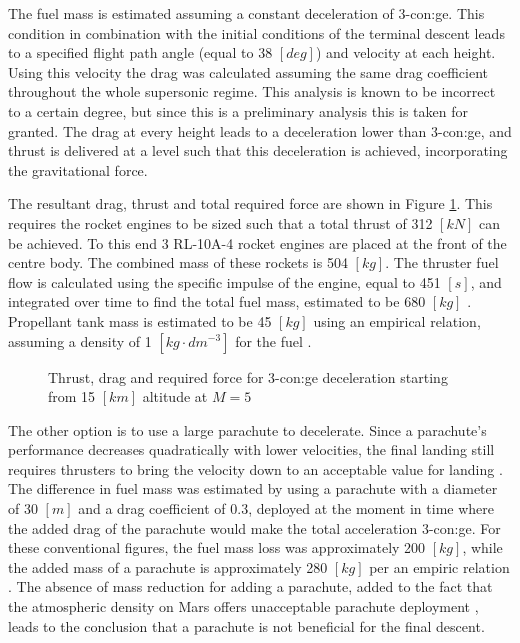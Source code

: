 The fuel mass is estimated assuming a constant deceleration of 3-\gls{con:ge}. This condition in combination with the initial conditions of the terminal descent leads to a specified flight path angle (equal to 38 $[deg]$) and velocity at each height. Using this velocity the drag was calculated assuming the same drag coefficient throughout the whole supersonic regime. This analysis is known to be incorrect to a certain degree, but since this is a preliminary analysis this is taken for granted. The drag at every height leads to a deceleration lower than 3-\gls{con:ge}, and thrust is delivered at a level such that this deceleration is achieved, incorporating the gravitational force. 

The resultant drag, thrust and total required force are shown in Figure \ref{fig:TDforce}. This requires the rocket engines to be sized such that a total thrust of 312 $[kN]$ can be achieved. To this end 3 RL-10A-4 rocket engines are placed at the front of the centre body. The combined mass of these rockets is 504 $[kg]$. The thruster fuel flow is calculated using the specific impulse of the engine, equal to 451 $[s]$, and integrated over time to find the total fuel mass, estimated to be 680 $[kg]$ \cite[p.538]{Wertz2011}. Propellant tank mass is estimated to be 45 $[kg]$ using an empirical relation, assuming a density of 1 $[kg\cdot dm^{-3}]$ for the fuel \cite[p.543]{Wertz2011}.

\begin{figure}[h]
	\centering
	\setlength{} 
	\setlength{}
	
	\caption{Thrust, drag and required force for 3-\gls{con:ge} deceleration starting from 15 $[km]$ altitude at $M=5$}
	\label{fig:TDforce}
\end{figure}


The other option is to use a large parachute to decelerate. Since a parachute's performance decreases quadratically with lower velocities, the final landing still requires thrusters to bring the velocity down to an acceptable value for landing \cite{Braun2007}. The difference in fuel mass was estimated by using a parachute with a diameter of 30 $[m]$ and a drag coefficient of 0.3, deployed at the moment in time where the added drag of the parachute would make the total acceleration 3-\gls{con:ge}. For these conventional figures, the fuel mass loss was approximately 200 $[kg]$, while the added mass of a parachute is approximately 280 $[kg]$ per an empiric relation \cite{Anderson1969}. The absence of mass reduction for adding a parachute, added to the fact that the atmospheric density on Mars offers unacceptable parachute deployment \cite{Korzun2009}, leads to the conclusion that a parachute is not beneficial for the final descent.

